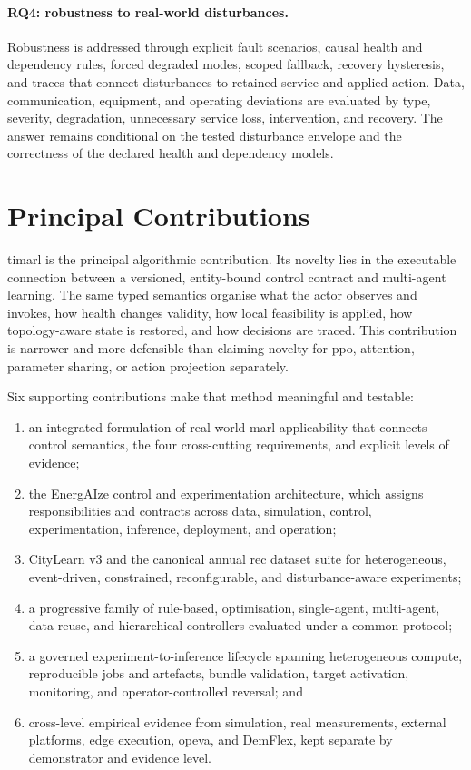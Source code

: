 \paragraph{RQ4: robustness to real-world disturbances.}
Robustness is addressed through explicit fault scenarios, causal health and dependency rules, forced degraded modes, scoped fallback, recovery hysteresis, and traces that connect disturbances to retained service and applied action. Data, communication, equipment, and operating deviations are evaluated by type, severity, degradation, unnecessary service loss, intervention, and recovery. The answer remains conditional on the tested disturbance envelope and the correctness of the declared health and dependency models.

\section{Principal Contributions}
\label{sec:conclusion-contributions}

\gls{timarl} is the principal algorithmic contribution. Its novelty lies in the executable connection between a versioned, entity-bound control contract and multi-agent learning. The same typed semantics organise what the actor observes and invokes, how health changes validity, how local feasibility is applied, how topology-aware state is restored, and how decisions are traced. This contribution is narrower and more defensible than claiming novelty for \gls{ppo}, attention, parameter sharing, or action projection separately.

Six supporting contributions make that method meaningful and testable:

\begin{enumerate}
  \item an integrated formulation of real-world \gls{marl} applicability that connects control semantics, the four cross-cutting requirements, and explicit levels of evidence;
  \item the EnergAIze control and experimentation architecture, which assigns responsibilities and contracts across data, simulation, control, experimentation, inference, deployment, and operation;
  \item CityLearn v3 and the canonical annual \gls{rec} dataset suite for heterogeneous, event-driven, constrained, reconfigurable, and disturbance-aware experiments;
  \item a progressive family of rule-based, optimisation, single-agent, multi-agent, data-reuse, and hierarchical controllers evaluated under a common protocol;
  \item a governed experiment-to-inference lifecycle spanning heterogeneous compute, reproducible jobs and artefacts, bundle validation, target activation, monitoring, and operator-controlled reversal; and
  \item cross-level empirical evidence from simulation, real measurements, external platforms, edge execution, \gls{opeva}, and DemFlex, kept separate by demonstrator and evidence level.
\end{enumerate}

